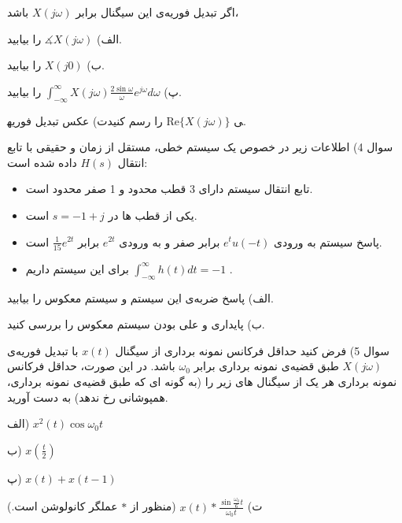 \documentclass{article}
\begin{document}
اگر تبدیل فوریه‌ی این سیگنال برابر 
$
X(j\omega)
$
باشد،

الف) 
$
\measuredangle X(j\omega)
$
را بیابید.

ب)
$
X(j0)
$
را بیابید.

پ)
$
\int_{-\infty}^{\infty}X(j\omega)\frac{2\sin\omega}{\omega}e^{j\omega}d\omega
$
را بیابید.

ت) عکس تبدیل فوریه‎ی
$
\mathrm{Re}\{X(j\omega)\}
$
را رسم کنید.

\newpage

سوال 4) اطلاعات زیر در خصوص یک سیستم خطی، مستقل از زمان و حقیقی با تابع انتقال 
$
H(s)
$
داده شده است:

\begin{itemize}
\item
تابع انتقال سیستم دارای 3 قطب محدود و 1 صفر محدود است.
\item
یکی از قطب ها در 
$
s=-1+j
$
است.
\item
پاسخ سیستم به ورودی 
$
e^tu(-t)
$
برابر صفر و به ورودی
$
e^{2t}
$
برابر
$
\frac{1}{15}e^{2t}
$
است.
\item
برای این سیستم داریم
$
\int_{-\infty}^{\infty}h(t)dt=-1
$
.
\end{itemize}

الف) پاسخ ضربه‌ی این سیستم و سیستم معکوس را بیابید.

ب) پایداری و علی بودن سیستم معکوس را بررسی کنید.

\newpage

سوال 5)  فرض کنید حداقل فرکانس نمونه برداری از سیگنال 
$
x(t)
$
با تبدیل فوریه‌ی 
$
X(j\omega)
$
طبق قضیه‌ی نمونه برداری برابر
$
\omega_0
$
باشد. در این صورت، حداقل فرکانس نمونه برداری هر یک از سیگنال های زیر را (به گونه ای که طبق قضیه‌ی نمونه برداری، همپوشانی رخ ندهد) به دست آورید.

الف) 
$
x^2(t)\cos\omega_0 t
$

ب)
$
x(\frac{t}{2})
$

پ)
$
x(t)+x(t-1)
$

ت)
$
x(t)*\frac{\sin \frac{\omega_0}{6}t}{\omega_0t}
$
(منظور از $*$ عملگر کانولوشن است.)
\end{document}
